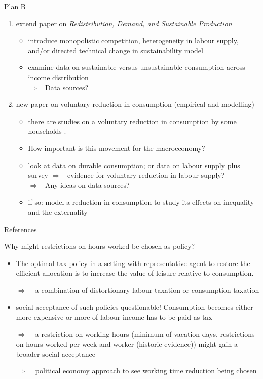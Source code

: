 \documentclass[11pt,aspectratio=169]{beamer}
\newcommand{\ar}{$\Rightarrow$ \ }
\begin{document}
\begin{frame}{Plan B}
\begin{enumerate}
	\item extend paper on \textit{Redistribution, Demand, and Sustainable Production}
	\begin{itemize}
\item introduce monopolistic competition, heterogeneity in labour supply, and/or directed technical change in sustainability model
\item examine data on sustainable versus unsustainable consumption across income distribution  \\
\alert{\ar Data sources?}
	\end{itemize}
\item new paper on voluntary reduction in consumption (empirical and modelling)
\begin{itemize}
	\item there are studies on a voluntary reduction in consumption by some households \citep{Alexander2012TheContext}. 
	\item How important is this movement for the macroeconomy?
\item look at data on durable consumption; or data on labour supply plus survey \ar evidence for voluntary reduction in labour supply?\\
\alert{\ar Any ideas on data sources?}
\item if so: model a reduction in consumption to study its effects on inequality and the externality
\end{itemize}
\end{enumerate}
\end{frame}
\begin{frame}[allowframebreaks]{References}
	
	
	
\end{frame}

\appendix
\begin{frame}{Why might restrictions on hours worked be chosen as policy?}
	\begin{itemize}
		\item \cite{Alvarez-Cuadrado2007EnvyHours}
		The optimal tax policy in a setting with representative agent to restore the efficient allocation is to increase the value of leisure relative to consumption.
		\item[\ar] a combination of distortionary labour taxation or consumption taxation
		\item social acceptance of such policies questionable! Consumption becomes either more expensive or more of labour income has to be paid as tax
		\item[\ar] a restriction on working hours (minimum of vacation days, restrictions on hours worked per week and worker (historic evidence)) might gain a broader social acceptance
		\item[\ar] political economy approach to see working time reduction being chosen
	\end{itemize}
\end{frame}
\end{document}
